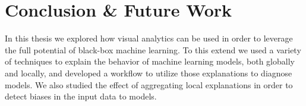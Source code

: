\chapter{Conclusion \& Future Work}
\label{chap:future_work}

In this thesis we explored how visual analytics can be used in order to leverage the full potential of black-box machine learning.
To this extend we used a variety of techniques to explain the behavior of machine learning models, both globally and locally, and developed a workflow to utilize those explanations to diagnose models.
We also studied the effect of aggregating local explanations in order to detect biases in the input data to models.
